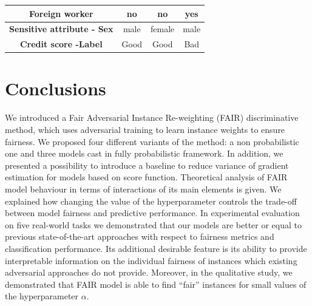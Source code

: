 \documentclass[preprint,12pt]{elsarticle}
\begin{document}
\begin{table}
{\begin{tabular}{|c|c|c|c|}
		\textbf{Foreign worker}                                  & no                         & no                                                                                   & yes                                                                                  \\ \hline
		\textbf{Sensitive attribute - Sex}                                             & male                       & female                                                                               & male                                                                                 \\ \hline
		\textbf{Credit score -Label}                                           & Good                       & Good                                                                                 & Bad                                                                                  \\ \hline
	\end{tabular}}
	\label{tab:Explainability}
\end{table}

\section{Conclusions}
\label{Sec:Conclusion}
We introduced a Fair Adversarial Instance Re-weighting (FAIR) discriminative method, which uses adversarial training to learn instance weights to ensure fairness. We proposed four different variants of the method: a non probabilistic one and three models cast in fully probabilistic framework. In addition, we presented a possibility to introduce a baseline to reduce variance of gradient estimation for models based on score function. Theoretical analysis of FAIR model behaviour in terms of interactions of its main elements is given. We explained how changing the value of the hyperparameter controls the trade-off between model fairness and predictive performance. In experimental evaluation on five real-world tasks we demonstrated that our models are better or equal to previous state-of-the-art approaches with respect to fairness metrics and classification performance. Its additional desirable feature is its ability to provide interpretable information on the individual fairness of instances which existing adversarial approaches do not provide. Moreover, in the qualitative study, we demonstrated that FAIR model is able to find ``fair'' instances for small values of the hyperparameter $\alpha$.
\end{document}
